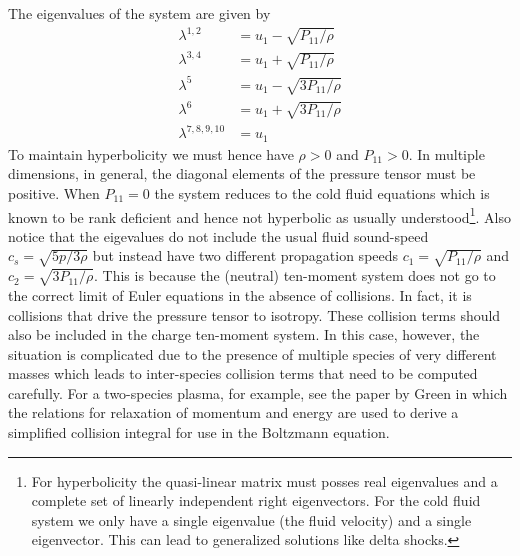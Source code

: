 \documentclass[11pt, reqno]{amsart}
\theoremstyle{definition}
\begin{document}
The eigenvalues of the system are given by
\begin{align}
  \lambda^{1,2} &= u_1-\sqrt{P_{11}/\rho} \\
  \lambda^{3,4} &= u_1+\sqrt{P_{11}/\rho} \\
  \lambda^{5}   &= u_1-\sqrt{3P_{11}/\rho} \\
  \lambda^{6}   &= u_1+\sqrt{3P_{11}/\rho} \\
  \lambda^{7,8,9,10}    &= u_1
\end{align}
To maintain hyperbolicity we must hence have $\rho>0$ and
$P_{11}>0$. In multiple dimensions, in general, the diagonal elements
of the pressure tensor must be positive. When $P_{11}=0$ the system
reduces to the cold fluid equations which is known to be rank
deficient and hence not hyperbolic as usually understood\footnote{For
  hyperbolicity the quasi-linear matrix must posses real eigenvalues
  and a complete set of linearly independent right eigenvectors. For
  the cold fluid system we only have a single eigenvalue (the fluid
  velocity) and a single eigenvector. This can lead to generalized
  solutions like delta shocks.}. Also notice that the eigevalues do
not include the usual fluid sound-speed $c_s=\sqrt{5p/3\rho}$ but
instead have two different propagation speeds $c_1=\sqrt{P_{11}/\rho}$
and $c_2=\sqrt{3P_{11}/\rho}$. This is because the (neutral)
ten-moment system does not go to the correct limit of Euler equations
in the absence of collisions. In fact, it is collisions that drive the
pressure tensor to isotropy. These collision terms should also be
included in the charge ten-moment system. In this case, however, the
situation is complicated due to the presence of multiple species of
very different masses which leads to inter-species collision terms
that need to be computed carefully. For a two-species plasma, for
example, see the paper by Green\cite{Green1973} in which the relations
for relaxation of momentum and energy are used to derive a simplified
collision integral for use in the Boltzmann equation.
\end{document}
